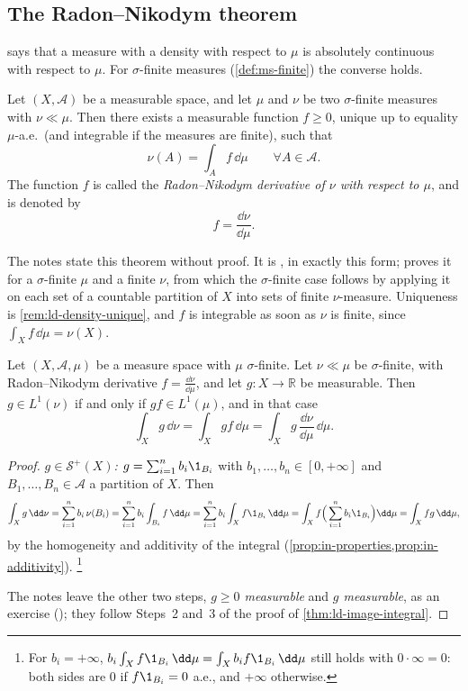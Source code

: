 \subsection{The Radon--Nikodym theorem}\label{sec:ld-radon-nikodym}

 says that a measure with a density with respect to $\mu$ is
absolutely continuous with respect to $\mu$. For $\sigma$-finite measures (\cref{def:ms-finite})
the converse holds.

\begin{theorem}\label{thm:ld-radon-nikodym}
Let $(X,\mathcal A)$ be a measurable space, and let $\mu$ and $\nu$ be two $\sigma$-finite
measures with $\nu\ll\mu$. Then there exists a measurable function $f\ge0$, unique up to
equality $\mu$-a.e.\ (and integrable if the measures are finite), such that
\[
  \nu(A)=\int_Af\,\dd\mu\qquad\forall A\in\mathcal A .
\]
The function $f$ is called the \emph{Radon--Nikodym derivative of $\nu$ with respect to $\mu$},
and is denoted by
\[
  f=\frac{\dd\nu}{\dd\mu}.
\]
\end{theorem}

The notes state this theorem without proof. It is \citet[Section~32]{billingsley}, in exactly
this form; \citet[Theorem~6.10]{rudin-rca} proves it for a $\sigma$-finite $\mu$ and a finite
$\nu$, from which the $\sigma$-finite case follows by applying it on each set of a countable
partition of $X$ into sets of finite $\nu$-measure. Uniqueness is \cref{rem:ld-density-unique},
and $f$ is integrable as soon as $\nu$ is finite, since $\int_Xf\,\dd\mu=\nu(X)$.

\begin{proposition}\label{prop:ld-density-integral}
Let $(X,\mathcal A,\mu)$ be a measure space with $\mu$ $\sigma$-finite. Let $\nu\ll\mu$ be
$\sigma$-finite, with Radon--Nikodym derivative $f=\frac{\dd\nu}{\dd\mu}$, and let $g:X\to\mathbb R$
be measurable. Then $g\in L^1(\nu)$ if and only if $gf\in L^1(\mu)$, and in that case
\[
  \int_Xg\,\dd\nu=\int_Xgf\,\dd\mu=\int_Xg\,\frac{\dd\nu}{\dd\mu}\,\dd\mu .
\]
\end{proposition}

\begin{proof}
\emph{$g\in\mathcal S^+(X)$:} $g=\sum_{i=1}^nb_i\1_{B_i}$ with $b_1,\dots,b_n\in[0,+\infty]$ and
$B_1,\dots,B_n\in\mathcal A$ a partition of $X$. Then
\[
  \int_Xg\,\dd\nu=\sum_{i=1}^nb_i\,\nu(B_i)=\sum_{i=1}^nb_i\int_{B_i}f\,\dd\mu
  =\sum_{i=1}^nb_i\int_Xf\1_{B_i}\,\dd\mu=\int_Xf\Big(\sum_{i=1}^nb_i\1_{B_i}\Big)\dd\mu=\int_Xfg\,\dd\mu,
\]
by the homogeneity and additivity of the integral (\cref{prop:in-properties,prop:in-additivity}).%
\footnote{For $b_i=+\infty$, $b_i\int_Xf\1_{B_i}\,\dd\mu=\int_Xb_if\1_{B_i}\,\dd\mu$ still holds with
$0\cdot\infty=0$: both sides are $0$ if $f\1_{B_i}=0$ a.e., and $+\infty$ otherwise.}

The notes leave the other two steps, \emph{$g\ge0$ measurable} and \emph{$g$ measurable}, as
an exercise (); they follow Steps~2 and~3 of the proof of
\cref{thm:ld-image-integral}.
\end{proof}

